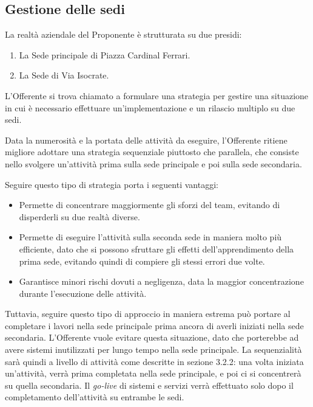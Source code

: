               
		\subsection{Gestione delle sedi}
			La realtà aziendale del Proponente è strutturata su due presidi:
            \begin{enumerate}
            \item La Sede principale di Piazza Cardinal Ferrari.
            \item La Sede di Via Isocrate.
            \end{enumerate}
            L'Offerente si trova chiamato a formulare una strategia per gestire una situazione in cui è necessario effettuare un'implementazione e un rilascio multiplo su due sedi.
            
            
            Data la numerosità e la portata delle attività da eseguire, l'Offerente ritiene migliore adottare una strategia sequenziale piuttosto che parallela, che consiste nello svolgere un'attività prima sulla sede principale e poi sulla sede secondaria. 
            
            
            Seguire questo tipo di strategia porta i seguenti vantaggi:
            \begin{itemize}
            	\item Permette di concentrare maggiormente gli sforzi del team, evitando di disperderli su due realtà diverse.
                \item Permette di eseguire l'attività sulla seconda sede in maniera molto più efficiente, dato che si possono sfruttare gli effetti dell'apprendimento della prima sede, evitando quindi di compiere gli stessi errori due volte.
                \item Garantisce minori rischi dovuti a negligenza, data la maggior concentrazione durante l'esecuzione delle attività.
            \end{itemize}
            Tuttavia, seguire questo tipo di approccio in maniera estrema può portare al completare i lavori nella sede principale prima ancora di averli iniziati nella sede secondaria. L'Offerente vuole evitare questa situazione, dato che porterebbe ad avere sistemi inutilizzati per lungo tempo nella sede principale. La sequenzialità sarà quindi a livello di attività come descritte in sezione 3.2.2: una volta iniziata un'attività, verrà prima completata nella sede principale, e poi ci si concentrerà su quella secondaria. Il \textit{go-live} di sistemi e servizi verrà effettuato solo dopo il completamento dell'attività su entrambe le sedi.
            
